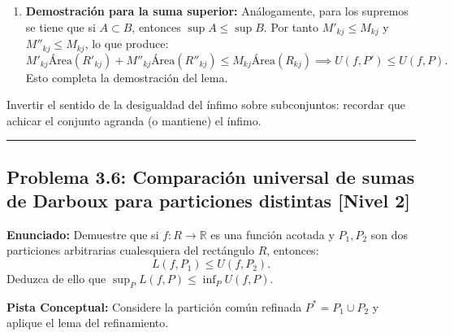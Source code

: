 \documentclass[11pt,a4paper]{article}
\begin{document}
\begin{enumerate}[label=\textbf{\arabic*.}]
\item \textbf{Demostración para la suma superior:}
Análogamente, para los supremos se tiene que si $A \subset B$, entonces $\sup A \le \sup B$.
Por tanto $M'_{kj} \le M_{kj}$ y $M''_{kj} \le M_{kj}$, lo que produce:
\begin{equation*}
M'_{kj} \text{Área}(R'_{kj}) + M''_{kj} \text{Área}(R''_{kj}) \le M_{kj} \text{Área}(R_{kj}) \implies U(f, P') \le U(f, P).
\end{equation*}
Esto completa la demostración del lema.
\end{enumerate}

\begin{trapbox}
Invertir el sentido de la desigualdad del ínfimo sobre subconjuntos: recordar que achicar el conjunto agranda (o mantiene) el ínfimo.
\end{trapbox}

\vspace{0.5cm}
\hrule
\vspace{0.5cm}

\subsection*{Problema 3.6: Comparación universal de sumas de Darboux para particiones distintas \hfill \color{primaryblue}\small[Nivel 2]}

\begin{tcolorbox}[colback=white,colframe=gray!40,arc=1mm,boxrule=0.5pt,left=3mm,right=3mm,top=2mm,bottom=2mm]
\textbf{Enunciado:} Demuestre que si $f: R \to \mathbb{R}$ es una función acotada y $P_1, P_2$ son dos particiones arbitrarias cualesquiera del rectángulo $R$, entonces:
\begin{equation*}
L(f, P_1) \le U(f, P_2).
\end{equation*}
Deduzca de ello que $\sup_P L(f, P) \le \inf_P U(f, P)$.
\end{tcolorbox}

\begin{tcolorbox}[colback=yellow!4,colframe=accentamber!70,arc=1mm,boxrule=0.5pt,left=3mm,right=3mm,top=1.5mm,bottom=1.5mm]
\textbf{Pista Conceptual:} Considere la partición común refinada $P^* = P_1 \cup P_2$ y aplique el lema del refinamiento.
\end{tcolorbox}
\end{document}
